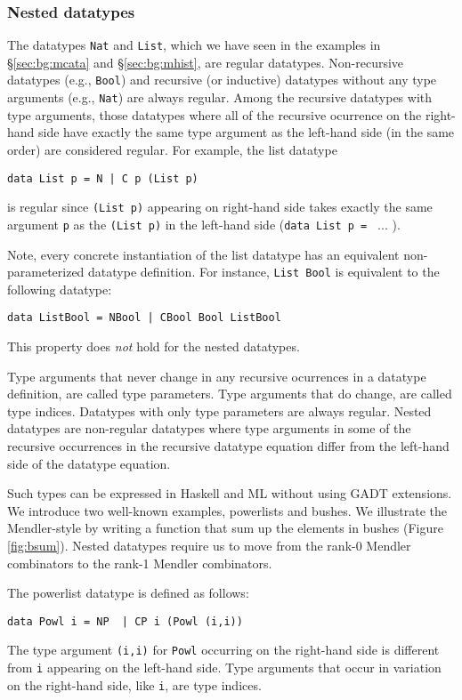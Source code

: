 \documentclass[letterpaper,12pt]{article}
\begin{document}
\subsubsection{Nested datatypes} \label{sec:bg:nonreg:nested}
The datatypes \verb|Nat| and \verb|List|, which we have seen in
the examples in \S\ref{sec:bg:mcata} and \S\ref{sec:bg:mhist},
are regular datatypes.  Non-recursive datatypes (e.g., \verb|Bool|) and
recursive (or inductive) datatypes without any type arguments (e.g., \verb|Nat|)
are always regular.  Among the recursive datatypes with type arguments,
those datatypes where all of the recursive ocurrence on the right-hand side
have exactly the same type argument as the left-hand side (in the same order)
are considered regular.  For example, the list datatype
\begin{verbatim}
data List p = N | C p (List p)
\end{verbatim}
is regular since \verb|(List p)| appearing on right-hand side takes exactly the same
argument \verb|p| as the \verb|(List p)| in the left-hand side (\verb|data List p = | ... ).

Note, every concrete instantiation of the list datatype has an equivalent
non-parameterized datatype definition.
For instance, \verb|List Bool| is equivalent to the following datatype:
\begin{verbatim}
data ListBool = NBool | CBool Bool ListBool
\end{verbatim}
This property does {\em not} hold for the nested datatypes.

Type arguments that never change in any recursive ocurrences
in a datatype definition, are called type parameters.
Type arguments that do change, are called type indices.
Datatypes with only type parameters are always regular.
Nested datatypes \cite{BirMee98} are non-regular datatypes where
type arguments in some of the recursive occurrences in the recursive
datatype equation differ from the left-hand side of the datatype equation.

Such types can be expressed in Haskell and ML without using GADT extensions.
We introduce two well-known examples, powerlists and bushes.
We illustrate the Mendler-style by writing a function that sum up the elements
in bushes (Figure \ref{fig:bsum}).  Nested datatypes require us to move from
the rank-0 Mendler combinators to the rank-1 Mendler combinators.

The powerlist datatype is defined as follows:
\begin{verbatim}
data Powl i = NP  | CP i (Powl (i,i))
\end{verbatim}
The type argument \verb|(i,i)| for \verb|Powl| occurring on the right-hand side is
different from \verb|i| appearing on the left-hand side.  Type arguments that
occur in variation on the right-hand side, like \verb|i|, are type indices.
\end{document}
